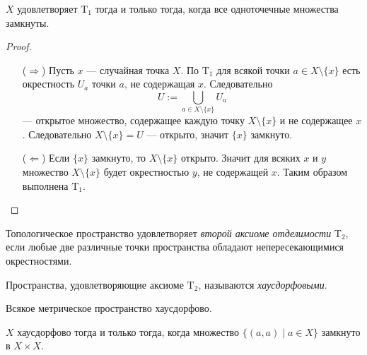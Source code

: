 \documentclass[12pt,a4paper]{article}
\newcommand{\T}{\ensuremath{\mathrm{T}}\xspace}
\begin{document}
    \begin{theorem}
        $X$ удовлетворяет $\T_1$ тогда и только тогда, когда все одноточечные множества замкнуты.
    \end{theorem}

    \begin{proof}
        \begin{itemize}
            \item[($\Rightarrow$)] Пусть $x$ --- случайная точка $X$. По $\T_1$ для всякой точки $a \in X \setminus \{x\}$ есть окрестность $U_a$ точки $a$, не содержащая $x$. Следовательно
                \[U := \bigcup_{a \in X \setminus \{x\}} U_a\]
                --- открытое множество, содержащее каждую точку $X \setminus \{x\}$ и не содержащее $x$. Следовательно $X \setminus \{x\} = U$ --- открыто, значит $\{x\}$ замкнуто.

            \item[($\Leftarrow$)] Если $\{x\}$ замкнуто, то $X \setminus \{x\}$ открыто. Значит для всяких $x$ и $y$ множество $X \setminus \{x\}$ будет окрестностью $y$, не содержащей $x$. Таким образом выполнена $\T_1$.
        \end{itemize}
    \end{proof}

    \begin{definition}
        Топологическое пространство удовлетворяет \emph{второй аксиоме отделимости} $\T_2$, если любые две различные точки пространства обладают непересекающимися окрестностями.

        Пространства, удовлетворяющие аксиоме $\T_2$, называются \emph{хаусдорфовыми}.
    \end{definition}

    \begin{remark*}
        Всякое метрическое пространство хаусдорфово.
    \end{remark*}

    \begin{theorem}
        $X$ хаусдорфово тогда и только тогда, когда множество $\{(a, a) \mid a \in X\}$ замкнуто в $X \times X$.
    \end{theorem}
\end{document}
